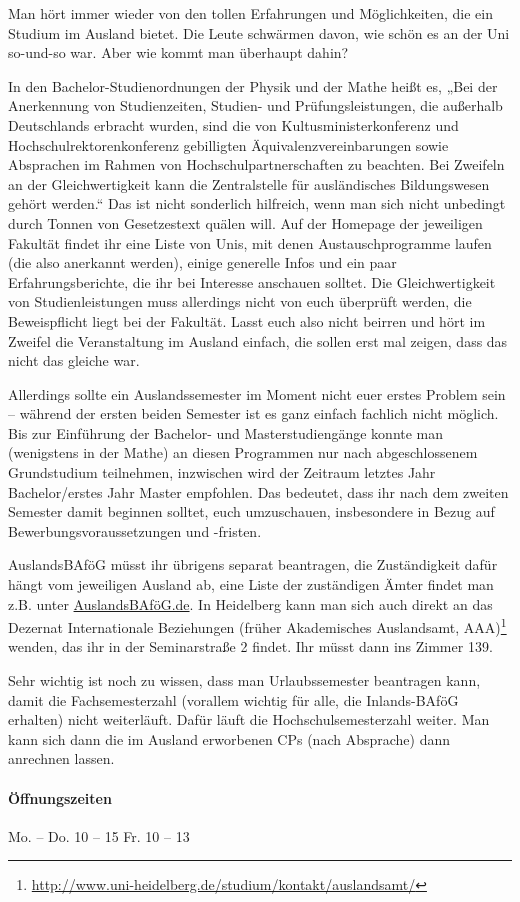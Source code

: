 \newpage{}%
Man hört immer wieder von den tollen Erfahrungen und Möglichkeiten, die ein Studium im Ausland bietet. Die Leute schwärmen davon, wie schön es an der Uni so-und-so war. Aber wie kommt man überhaupt dahin?

In den Bachelor-Studienordnungen der Physik und der Mathe heißt es, „Bei der Anerkennung von Studienzeiten, Studien- und Prüfungsleistungen, die außerhalb Deutschlands erbracht wurden, sind die von Kultusministerkonferenz und Hochschulrektorenkonferenz gebilligten Äquivalenzvereinbarungen sowie Absprachen im Rahmen von Hochschulpartnerschaften zu beachten. Bei Zweifeln an der Gleichwertigkeit kann die Zentralstelle für ausländisches Bildungswesen gehört werden.“ Das ist nicht sonderlich hilfreich, wenn man sich nicht unbedingt durch Tonnen von Gesetzestext quälen will. Auf der Homepage der jeweiligen Fakultät findet ihr eine Liste von Unis, mit denen Austauschprogramme laufen (die also anerkannt werden), einige generelle Infos und ein paar Erfahrungsberichte, die ihr bei Interesse anschauen solltet. Die Gleichwertigkeit von Studienleistungen muss allerdings nicht von euch überprüft werden, die Beweispflicht liegt bei der Fakultät. Lasst euch also nicht beirren und hört im Zweifel die Veranstaltung im Ausland einfach, die sollen erst mal zeigen, dass das nicht das gleiche war.

Allerdings sollte ein Auslandssemester im Moment nicht euer erstes Problem sein -- während der ersten beiden Semester ist es ganz einfach fachlich nicht möglich. Bis zur Einführung der Bachelor- und Masterstudiengänge konnte man (wenigstens in der Mathe) an diesen Programmen nur nach abgeschlossenem Grundstudium teilnehmen, inzwischen wird der Zeitraum letztes Jahr Bachelor/erstes Jahr Master empfohlen. Das bedeutet, dass ihr nach dem zweiten Semester damit beginnen solltet, euch umzuschauen, insbesondere in Bezug auf Bewerbungsvoraussetzungen und -fristen.

AuslandsBAföG müsst ihr übrigens separat beantragen, die Zu\-stän\-dig\-keit dafür hängt vom jeweiligen Ausland ab, eine Liste der zuständigen Ämter findet man z.B. unter \url{AuslandsBAföG.de}. In Heidelberg kann man sich auch direkt an das Dezernat Internationale Beziehungen (früher Akademisches Auslandsamt, AAA)\footnote{\url{http://www.uni-heidelberg.de/studium/kontakt/auslandsamt/}} wenden, das ihr in der Seminarstraße 2 findet. Ihr müsst dann ins Zimmer 139.

Sehr wichtig ist noch zu wissen, dass man Urlaubssemester beantragen kann, damit die Fachsemesterzahl (vorallem wichtig für alle, die Inlands-BAföG erhalten) nicht weiterläuft. Dafür läuft die Hochschulsemesterzahl weiter. Man kann sich dann die im Ausland erworbenen CPs (nach Absprache) dann anrechnen lassen.

\paragraph{Öffnungszeiten} Mo. -- Do. 10 -- 15 \qquad Fr. 10 -- 13

